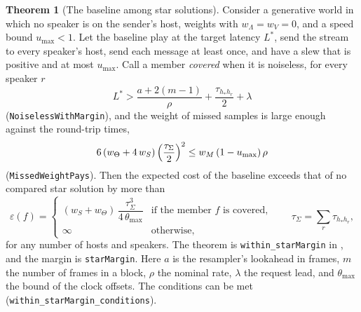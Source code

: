 \documentclass[11pt,a4paper]{article}
\newcommand{\lean}[1]{\texttt{#1}}
\theoremstyle{definition}
\newtheorem{theorem}[definition]{Theorem}
\begin{document}
\begin{theorem}[The baseline among star solutions]\label{thm:star-optimal}
Consider a generative world in which no speaker is on the sender's host,
weights with $w_\Lambda = w_V = 0$, and a speed bound $u_{\max} < 1$. Let
the baseline play at the target latency $L^*$, send the stream to every
speaker's host, send each message at least once, and have a slew that is
positive and at most $u_{\max}$. Call a member \emph{covered} when it is
noiseless, for every speaker $r$
\[
  L^* > \frac{a + 2(m - 1)}{\rho} + \frac{\tau_{h_* h_r}}{2} + \lambda
\]
(\lean{NoiselessWithMargin}), and the weight of missed samples is large
enough against the round-trip times,
\[
  6\,(w_\Theta + 4\,w_S)\,\Bigl(\frac{\tau_\Sigma}{2}\Bigr)^2
    \le w_M\,(1 - u_{\max})\,\rho
\]
(\lean{MissedWeightPays}). Then the expected cost of the baseline exceeds
that of no compared star solution by more than
\[
  \varepsilon(f) =
  \begin{cases}
    (w_S + w_\Theta)\,\dfrac{\tau_\Sigma^3}{4\,\theta_{\max}}
      & \text{if the member } f \text{ is covered,} \\[6pt]
    \infty & \text{otherwise,}
  \end{cases}
  \qquad \tau_\Sigma = \sum_r \tau_{h_* h_r},
\]
for any number of hosts and speakers. The theorem is
\lean{within\_\allowbreak starMargin} in
, and the margin is
\lean{starMargin}. Here $a$ is the resampler's lookahead in frames, $m$
the number of frames in a block, $\rho$ the nominal rate, $\lambda$ the
request lead, and $\theta_{\max}$ the bound of the clock offsets. The
conditions can be met
(\lean{within\_\allowbreak starMargin\_\allowbreak conditions}).
\end{theorem}
\end{document}
